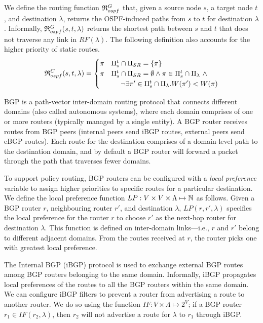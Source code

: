 We define the routing function 
$\mathfrak{R}_{ospf}^G$ 
that, given 
a source node $s$,
a target node $t$,
and destination   
$\lambda$,
returns the OSPF-induced paths from $s$ to $t$ for destination   $\lambda$.
Informally, $\mathfrak{R}_{ospf}^G(s,t,\lambda)$ returns the shortest path between
$s$ and $t$ that does not traverse any link in $RF(\lambda)$. The following definition also
accounts for the higher priority of static routes.
\[
\mathfrak{R}_{ospf}^C(s,t,\lambda) = 
\begin{cases}
\pi  & \text{$\Pi_s^t \cap \Pi_{SR} =\{\pi\}$} \\
\pi & 
\text{$\Pi_s^t \cap \Pi_{SR} =\emptyset \wedge \pi\in \Pi_s^t\cap \Pi_\lambda ~\wedge $}  \\
& \text{~~~~$\neg\exists \pi'\in\Pi_s^t\cap \Pi_\lambda . W(\pi')< W(\pi)$} 
\end{cases}
\]

 BGP is a path-vector inter-domain routing protocol
that connects different domains (also called autonomous systems), where each domain
comprises of one or more routers (typically managed by a single
entity). A BGP router receives routes from BGP peers (internal peers
send iBGP routes, external peers send eBGP routes). Each route for the
destination comprises of a domain-level path to the destination
domain, and by default a BGP router will forward a packet through  the path that traverses fewer domains.
 
To support policy routing, BGP routers can be configured with a
\emph{local preference} variable to assign higher priorities to
specific routes for a particular destination. We define the local
preference function $LP: V \times V \times \Lambda \mapsto \mathbb{N}$ as
follows.  Given a BGP router $r$, neighbouring router $r'$, and  
destination $\lambda$, $LP(r, r', \lambda)$ specifies the local
preference for the router $r$ to choose $r'$ as the next-hop router for destination $\lambda$.  This function is defined
on inter-domain links---i.e., $r$ and $r'$ belong to different adjacent domains.  
From the routes received at $r$, the router
picks one with greatest local preference.

The Internal BGP (iBGP) protocol is used to 
exchange external BGP routes 
among BGP routers belonging
to the same domain. Informally, iBGP propagates local preferences of the routes to all the BGP routers within the same domain. 
We can configure iBGP 
filters to prevent a router from advertising 
a route to another router. We do so using the 
function $IF: V \times \Lambda \mapsto 2^V$;
if a BGP router $r_1 \in IF(r_2, \lambda)$, then
$r_2$ will not advertise a route for $\lambda$ to
$r_1$ through iBGP. 
 
